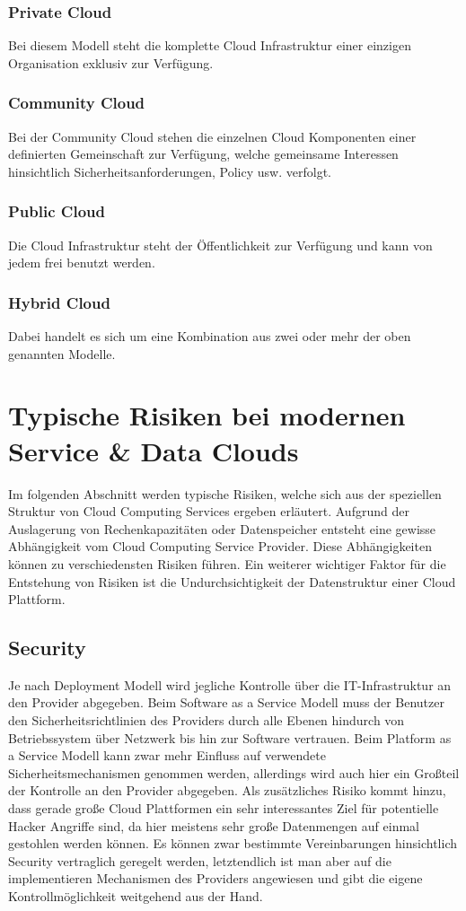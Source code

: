 \documentclass{report}
\begin{document}
\subsubsection{Private Cloud}
Bei diesem Modell steht die komplette Cloud Infrastruktur einer einzigen Organisation exklusiv zur Verfügung.

\subsubsection{Community Cloud}
Bei der Community Cloud stehen die einzelnen Cloud Komponenten einer definierten Gemeinschaft zur Verfügung, welche gemeinsame Interessen hinsichtlich Sicherheitsanforderungen, Policy usw. verfolgt.

\subsubsection{Public Cloud}
Die Cloud Infrastruktur steht der Öffentlichkeit zur Verfügung und kann von jedem frei benutzt werden.

\subsubsection{Hybrid Cloud}
Dabei handelt es sich um eine Kombination aus zwei oder mehr der oben genannten Modelle.

\section{Typische Risiken bei modernen Service \& Data Clouds}
Im folgenden Abschnitt werden typische Risiken, welche sich aus der speziellen Struktur von Cloud Computing Services ergeben erläutert. Aufgrund der Auslagerung von Rechenkapazitäten oder Datenspeicher entsteht eine gewisse Abhängigkeit vom Cloud Computing Service Provider. Diese Abhängigkeiten können zu verschiedensten Risiken führen. Ein weiterer wichtiger Faktor für die Entstehung von Risiken ist die Undurchsichtigkeit der Datenstruktur einer Cloud Plattform.  

\subsection{Security}
Je nach Deployment Modell wird jegliche Kontrolle über die IT-Infrastruktur an den Provider abgegeben. Beim Software as a Service Modell muss der Benutzer den Sicherheitsrichtlinien des Providers durch alle Ebenen hindurch von Betriebssystem über Netzwerk bis hin zur Software vertrauen. Beim Platform as a Service Modell kann zwar mehr Einfluss auf verwendete Sicherheitsmechanismen genommen werden, allerdings wird auch hier ein Großteil der Kontrolle an den Provider abgegeben. Als zusätzliches Risiko kommt hinzu, dass gerade große Cloud Plattformen ein sehr interessantes Ziel für potentielle Hacker Angriffe sind, da hier meistens sehr große Datenmengen auf einmal gestohlen werden können. Es können zwar bestimmte Vereinbarungen hinsichtlich Security vertraglich geregelt werden, letztendlich ist man aber auf die implementieren Mechanismen des Providers angewiesen und gibt die eigene Kontrollmöglichkeit weitgehend aus der Hand.  \cite{bro2008} 
\end{document}
